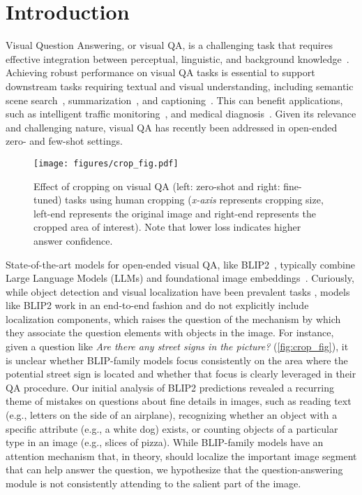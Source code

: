 \section{Introduction}

Visual Question Answering, or visual QA, is a challenging task that requires effective integration between perceptual, linguistic, and background knowledge~\citep{schwenk2022okvqa}. Achieving robust performance on visual QA tasks is essential to support downstream tasks requiring textual and visual understanding, including semantic scene search~\citep{vo2019reading}, summarization~\citep{rafiq2020scene}, and captioning~\citep{stefanini2022show}. This can benefit applications, such as intelligent traffic monitoring~\citep{xu2021sutd}, and medical diagnosis~\citep{ren2020cgmvqa}.
Given its relevance and challenging nature, visual QA has recently been addressed in open-ended zero- and few-shot settings. 


\begin{figure}[h]
    \centering
    \texttt{[image: figures/crop\_fig.pdf]}
    \caption{Effect of cropping on visual QA (left: zero-shot and right: fine-tuned) tasks using human cropping (\textit{x-axis} represents cropping size, left-end represents the original image and right-end represents the cropped area of interest). Note that lower loss indicates higher answer confidence.}%
    \label{fig:crop_fig}
\end{figure}

State-of-the-art models for open-ended visual QA, like BLIP2~\citep{li2023blip}, typically combine Large Language Models (LLMs) and foundational image embeddings~\citep{brown2020language}. Curiously, while object detection and visual localization have been prevalent tasks \citep{yolo, pascal}, models like BLIP2 work in an end-to-end fashion and do not explicitly include localization components, which raises the question of the mechanism by which they associate the question elements with objects in the image. For instance, given a question like \textit{Are there any street signs in the picture?} (\autoref{fig:crop_fig}), it is unclear whether BLIP-family models focus consistently on the area where the potential street sign is located and whether that focus is clearly leveraged in their QA procedure. Our initial analysis of BLIP2 predictions revealed a recurring theme of mistakes on questions about fine details in images, such as reading text (e.g., letters on the side of an airplane), recognizing whether an object with a specific attribute (e.g., a white dog) exists, or counting objects of a particular type in an image (e.g., slices of pizza). While BLIP-family models have an attention mechanism that, in theory, should localize the important image segment that can help answer the question, we hypothesize that the question-answering module is not consistently attending to the salient part of the image.




